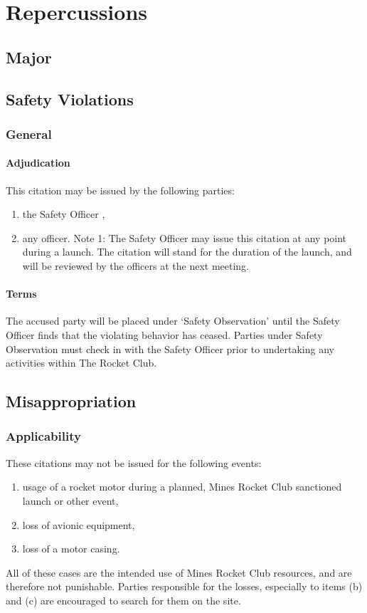 \documentclass[12pt]{article}
\newcommand{\note}[1]{\raisebox{.5em}{\small Note #1}}
\begin{document}
\section{Repercussions}
\subsection{Major}
\subsection{Safety Violations}
\subsubsection{General}
\label{citation:s.general}
\paragraph{Adjudication}
This citation may be issued by the following parties:
\begin{enumerate}[label=(\roman*)]
    \item the Safety Officer \note{1},
    \item any officer. \newline
    Note 1: The Safety Officer may issue this citation at any point during a launch.
    The citation will stand for the duration of the launch, 
    and will be reviewed by the officers at the next meeting.
\end{enumerate}
\paragraph{Terms}
\label{safob}
The accused party will be placed under `Safety Observation' until the Safety Officer finds that the violating behavior has ceased.
Parties under Safety Observation must check in with the Safety Officer prior to undertaking any activities within The Rocket Club.

\subsection{Misappropriation}
\subsubsection{Applicability}
These citations may not be issued for the following events:
\begin{enumerate}[label=(\roman*)]
    \item usage of a rocket motor during a planned, Mines Rocket Club sanctioned launch or other event,
    \item loss of avionic equipment,
    \item loss of a motor casing.
\end{enumerate}
All of these cases are the intended use of Mines Rocket Club resources, and are therefore not punishable.
Parties responsible for the losses, especially to items (b) and (c) are encouraged to search for them on the site.
\end{document}
